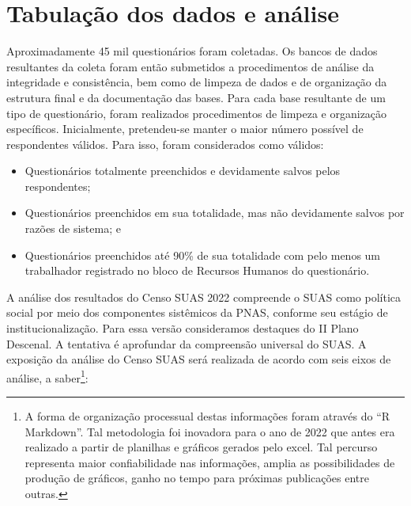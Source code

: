 \documentclass[
  letterpaper,
  DIV=11,
  numbers=noendperiod]{scrreprt}
\begin{document}
\section{Tabulação dos dados e
análise}\label{tabulauxe7uxe3o-dos-dados-e-anuxe1lise}

Aproximadamente 45 mil questionários foram coletadas. Os bancos de dados
resultantes da coleta foram então submetidos a procedimentos de análise
da integridade e consistência, bem como de limpeza de dados e de
organização da estrutura final e da documentação das bases. Para cada
base resultante de um tipo de questionário, foram realizados
procedimentos de limpeza e organização específicos. Inicialmente,
pretendeu-se manter o maior número possível de respondentes válidos.
Para isso, foram considerados como válidos:

\begin{itemize}
\item
  Questionários totalmente preenchidos e devidamente salvos pelos
  respondentes;
\item
  Questionários preenchidos em sua totalidade, mas não devidamente
  salvos por razões de sistema; e
\item
  Questionários preenchidos até 90\% de sua totalidade com pelo menos um
  trabalhador registrado no bloco de Recursos Humanos do questionário.
\end{itemize}

A análise dos resultados do Censo SUAS 2022 compreende o SUAS como
política social por meio dos componentes sistêmicos da PNAS, conforme
seu estágio de institucionalização. Para essa versão consideramos
destaques do II Plano Descenal. A tentativa é aprofundar da compreensão
universal do SUAS. A exposição da análise do Censo SUAS será realizada
de acordo com seis eixos de análise, a saber\footnote{A forma de
  organização processual destas informações foram através do ``R
  Markdown''. Tal metodologia foi inovadora para o ano de 2022 que antes
  era realizado a partir de planilhas e gráficos gerados pelo excel. Tal
  percurso representa maior confiabilidade nas informações, amplia as
  possibilidades de produção de gráficos, ganho no tempo para próximas
  publicações entre outras.}:
\end{document}
